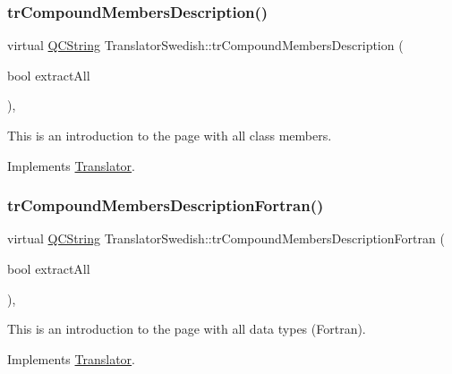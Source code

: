 \subsubsection{\texorpdfstring{trCompoundMembersDescription()}{trCompoundMembersDescription()}}
{\footnotesize\ttfamily virtual \mbox{\hyperlink{class_q_c_string}{Q\+C\+String}} Translator\+Swedish\+::tr\+Compound\+Members\+Description (\begin{DoxyParamCaption}\item[{bool}]{extract\+All }\end{DoxyParamCaption})\hspace{0.3cm}{\ttfamily [inline]}, {\ttfamily [virtual]}}

This is an introduction to the page with all class members. 

Implements \mbox{\hyperlink{class_translator}{Translator}}.

\mbox{\label{class_translator_swedish_a5651872869292c6398250264a3a4c244}} 
\subsubsection{\texorpdfstring{trCompoundMembersDescriptionFortran()}{trCompoundMembersDescriptionFortran()}}
{\footnotesize\ttfamily virtual \mbox{\hyperlink{class_q_c_string}{Q\+C\+String}} Translator\+Swedish\+::tr\+Compound\+Members\+Description\+Fortran (\begin{DoxyParamCaption}\item[{bool}]{extract\+All }\end{DoxyParamCaption})\hspace{0.3cm}{\ttfamily [inline]}, {\ttfamily [virtual]}}

This is an introduction to the page with all data types (Fortran). 

Implements \mbox{\hyperlink{class_translator}{Translator}}.

\mbox{\label{class_translator_swedish_aa098946f953e1658bc0ddf41a5539164}} 
